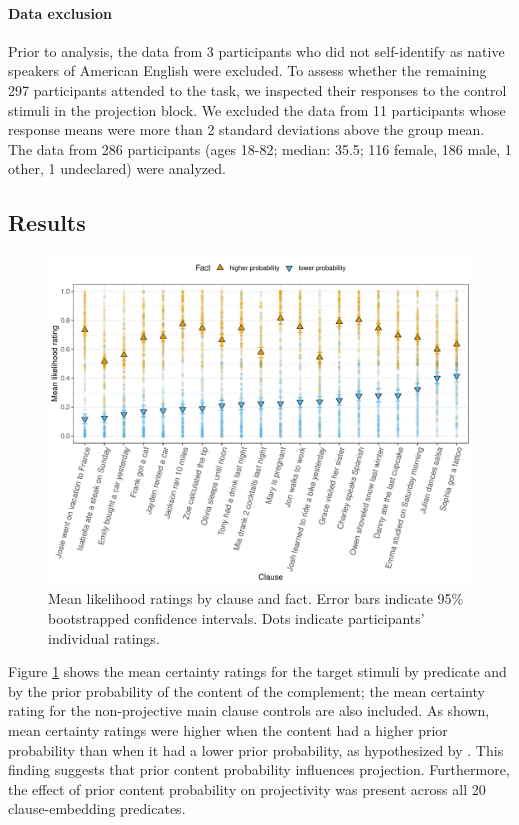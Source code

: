 \documentclass[11pt,fleqn]{article}
\newcommand{\6}{\mbox{$[\hspace*{-.6mm}[$}}
\newcommand{\9}{\mbox{$]\hspace*{-.6mm}]$}}
\begin{document}
\paragraph{Data exclusion} Prior to analysis, the data from 3 participants who did not self-identify as native speakers of American English were excluded. To assess whether the remaining 297 participants attended to the task, we inspected their responses to the control stimuli in the projection block. We excluded the data from 11 participants whose response means were more than 2 standard deviations above the group mean. The data from 286 participants (ages 18-82; median: 35.5; 116 female, 186 male, 1 other, 1 undeclared) were analyzed.

\subsection{Results}

\begin{figure}[h!]
\centering
\includegraphics[width=.75\paperwidth]{../../results/exp4/graphs/prior-ratings}

\caption{Mean likelihood ratings by clause and fact. Error bars indicate 95\% bootstrapped confidence intervals. Dots indicate participants' individual ratings.} 
\label{f-projection}
\end{figure}


Figure \ref{f-projection} shows the mean certainty ratings for the target stimuli by predicate and by the prior probability of the content of the complement; the mean certainty rating for the non-projective main clause controls are also included. As shown, mean certainty ratings were higher when the content had a higher prior probability than when it had a lower prior probability, as hypothesized by \citet{tbd-variability}. This finding suggests that prior content probability influences projection. Furthermore, the effect of prior content probability on projectivity was present across all 20 clause-embedding predicates.
\end{document}
